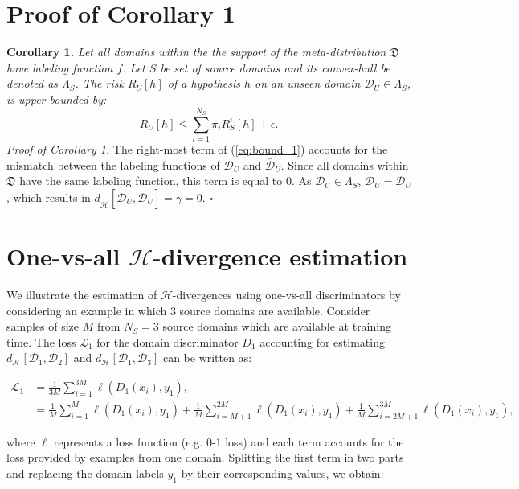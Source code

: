 \documentclass{article}
\begin{document}
\section{Proof of Corollary 1}
\textbf{Corollary 1.} \textit{Let all domains within the the support of the meta-distribution $\mathfrak{D}$ have labeling function $f$. Let $S$ be set of source domains and its convex-hull be denoted as $\Lambda_S$. The risk $R_U[h]$ of a hypothesis $h$ on an unseen domain $ \mathcal{D}_U \in \Lambda_S$, is upper-bounded by:}
\begin{equation}\label{eq:cor_1}
     R_U[h] \leq \sum_{i=1}^{N_S} \pi_{i} R^i_S[h] + \epsilon.
\end{equation}
\textit{Proof of Corollary 1.} The right-most term of (\ref{eq:bound_1}) accounts for the mismatch between the labeling functions of $\mathcal{D}_U$ and $\bar{\mathcal{D}}_U$. Since all domains within $\mathfrak{D}$ have the same labeling function, this term is equal to 0. As $\mathcal{D}_U \in \Lambda_S$, $\mathcal{D}_U=\bar{\mathcal{D}}_U$, which results in $d_{\tilde{\mathcal{H}}}[\mathcal{D}_U, \bar{\mathcal{D}}_U]=\gamma=0$. $\square$

\section{One-vs-all $\mathcal{H}$-divergence estimation}
We illustrate the estimation of $\mathcal{H}$-divergences using one-vs-all discriminators by considering an example in which 3 source domains are available. Consider samples of size $M$ from $N_S=3$ source domains which are available at training time. The loss $\mathcal{L}_1$ for the domain discriminator $D_1$ accounting for estimating $d_{\mathcal{H}}[\mathcal{D}_1, \mathcal{D}_2]$ and $d_{\mathcal{H}}[\mathcal{D}_1, \mathcal{D}_3]$ can be written as:

\begin{equation}
\begin{split}
\mathcal{L}_1 &= \frac{1}{3M} \sum_{i=1}^{3M} \ell(D_1(x_i), y_1), \\
              &= \frac{1}{M} \sum_{i=1}^{M} \ell(D_1(x_i), y_1) + \frac{1}{M} \sum_{i=M+1}^{2M} \ell(D_1(x_i), y_1) + \frac{1}{M} \sum_{i=2M+1}^{3M} \ell(D_1(x_i), y_1),
\end{split}
\end{equation}
 
where $\ell$ represents a loss function (e.g. 0-1 loss) and each term accounts for the loss provided by examples from one domain. Splitting the first term in two parts and replacing the domain labels $y_1$ by their corresponding values, we obtain:
\end{document}
